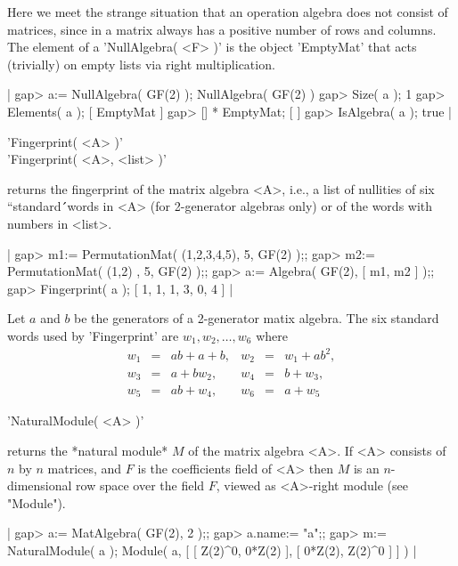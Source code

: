 Here we meet the strange situation that an operation algebra does not
consist of matrices, since in {\GAP} a matrix always has a positive
number of rows and columns.  The element of a 'NullAlgebra( <F> )' is
the object 'EmptyMat' that acts (trivially) on empty lists via right
multiplication.

|    gap> a:= NullAlgebra( GF(2) );
    NullAlgebra( GF(2) )
    gap> Size( a );
    1
    gap> Elements( a );
    [ EmptyMat ]
    gap> [] * EmptyMat;
    [  ]
    gap> IsAlgebra( a );
    true |


'Fingerprint( <A> )'\\
'Fingerprint( <A>, <list> )'

returns the fingerprint of the matrix algebra <A>, i.e., a list of
nullities of six ``standard\'\'\ words in <A> (for 2-generator
algebras only) or of the words with numbers in <list>.

|    gap> m1:= PermutationMat( (1,2,3,4,5), 5, GF(2) );;
    gap> m2:= PermutationMat( (1,2)      , 5, GF(2) );;
    gap> a:= Algebra( GF(2), [ m1, m2 ] );;
    gap> Fingerprint( a );
    [ 1, 1, 1, 3, 0, 4 ] |

Let $a$ and $b$ be the generators of a 2-generator matix algebra.
The six standard words used by 'Fingerprint' are $w_1, w_2, \ldots, w_6$
where
\[ \begin{array}{llllll} w_1 & = & a b + a + b, &
                         w_2 & = & w_1 + a b^2, \\
                         w_3 & = & a + b w_2,   &
                         w_4 & = & b + w_3,     \\
                         w_5 & = & a b + w_4,   &
                         w_6 & = & a + w_5     \end{array} \]


'NaturalModule( <A> )'

returns the *natural module* $M$ of the matrix algebra <A>.
If <A> consists of $n$ by $n$ matrices, and $F$ is the coefficients field of
<A> then $M$ is an $n$-dimensional row space over the field $F$, viewed as
<A>-right module (see "Module").

|    gap> a:= MatAlgebra( GF(2), 2 );;
    gap> a.name:= "a";;
    gap> m:= NaturalModule( a );
    Module( a, [ [ Z(2)^0, 0*Z(2) ], [ 0*Z(2), Z(2)^0 ] ] ) |

